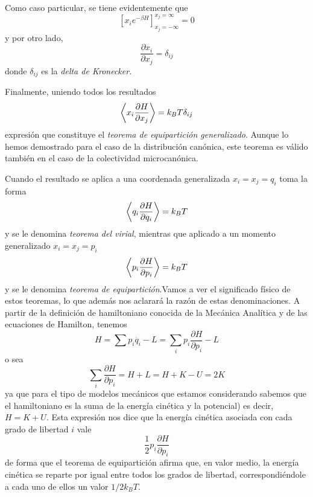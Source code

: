 Como caso particular, se tiene evidentemente que
$$\left[ x_ie^{-\beta H} \right]_{x_j = -\infty}^{x_j = \infty} = 0$$
y por otro lado,
$$\frac{\partial x_i}{\partial x_j} = \delta_{ij}$$
donde $\delta_{ij}$ es la \emph{delta de Kronecker}.

Finalmente, uniendo todos los resultados
\begin{equation}
	\expval{x_i\frac{\partial H}{\partial x_j}} = k_B T \delta_{ij}
\end{equation}
expresión que constituye el \emph{teorema de equipartición generalizado}. Aunque lo hemos demostrado para el caso de la distribución canónica, este teorema es válido también en el caso de la colectividad microcanónica.

Cuando el resultado se aplica a una coordenada generalizada $x_i = x_j = q_i$ toma la forma
\begin{equation}
	\expval{q_i\frac{\partial H}{\partial q_i}} = k_B T
\end{equation}
y se le denomina \emph{teorema del virial}, mientras que aplicado a un momento generalizado $x_i = x_j = p_i$
\begin{equation}
	\expval{p_i\frac{\partial H}{\partial p_i}} = k_B T
\end{equation}
y se le denomina \emph{teorema de equipartición}.Vamos a ver el significado físico de estos
teoremas, lo que además nos aclarará la razón de estas denominaciones.
A partir de la definición de hamiltoniano conocida de la Mecánica Analítica y de las ecuaciones de Hamilton, tenemos
\begin{equation}
	H = \sum p_i\dot{q_i} - L = \sum_i p_i\frac{\partial H}{\partial p_i} - L
\end{equation}
o sea
\begin{equation}
	\sum_i \frac{\partial H}{\partial p_i} = H + L = H + K - U = 2K
\end{equation}
ya que para el tipo de modelos mecánicos que estamos considerando sabemos que el hamiltoniano es la suma de la energía cinética y la potencial) es decir, $H = K + U$.
Esta expresión nos dice que la energía cinética asociada con cada grado de libertad $i$ vale
$$\frac{1}{2}p_i\frac{\partial H}{\partial p_i}$$
de forma que el teorema de equipartición afirma que, en valor medio, la energía cinética se reparte por igual entre todos los grados de libertad, correspondiéndole a cada uno de ellos un valor $1/2 k_B T$.
